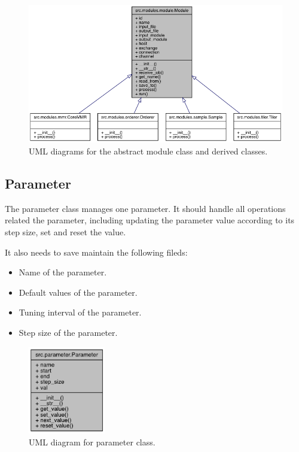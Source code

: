 \documentclass{article}
\begin{document}
    \begin{figure}[H]
        \begin{center}
            \includegraphics[width=\textwidth]{fig/module_uml.png}
        \end{center}
        \label{fig:module_uml}
        \caption{UML diagrams for the abstract module class and derived classes.}
    \end{figure}

    \subsection{Parameter}
    \label{sec:parameter}
    The parameter class manages one parameter.
    It should handle all operations related the parameter,
    including updating the parameter value according to its step size,
    set and reset the value.

    It also needs to save maintain the following fileds:
    \begin{itemize}
        \item Name of the parameter.
        \item Default values of the parameter.
        \item Tuning interval of the parameter.
        \item Step size of the parameter.
    \end{itemize}

    \begin{figure}[H]
        \begin{center}
            \includegraphics[width=0.3\textwidth]{fig/param_uml.png}
        \end{center}
        \label{fig:param_uml}
        \caption{UML diagram for parameter class.}
    \end{figure}
\end{document}
